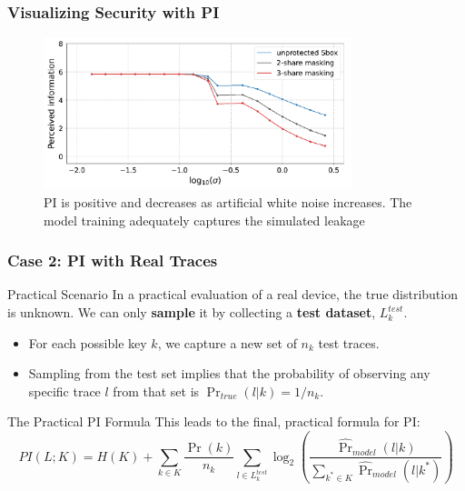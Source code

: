 \begin{frame}
    \frametitle{Visualizing Security with PI}
   \begin{figure}
        \centering
        \includegraphics[width=0.8\textwidth]{metrics/Pictures/PI_masking.png}
        \caption{PI is positive and decreases as artificial white noise increases. The model training adequately captures the simulated leakage}
    \end{figure}
\end{frame}


\begin{frame}
    \frametitle{Case 2: PI with Real Traces}
    
    \begin{block}{Practical Scenario}
        In a practical evaluation of a real device, the true distribution is unknown. We can only \textbf{sample} it by collecting a \textbf{test dataset}, $L_k^{test}$.
        
        \begin{itemize}
            \item For each possible key $k$, we capture a new set of $n_k$ test traces.
            \item Sampling from the test set implies that the probability of observing any specific trace $l$ from that set is $\Pr_{true}(l|k) = 1/n_k$.
        \end{itemize}
    \end{block}
    
    \begin{alertblock}{The Practical PI Formula}
        This leads to the final, practical formula for PI:
        $$ PI(L;K) = H(K) + \sum_{k \in K} \frac{\Pr(k)}{n_k} \sum_{l \in L_k^{test}} \log_2 \left( \frac{\hat{\Pr}_{model}(l|k)}{\sum_{k^* \in K} \hat{\Pr}_{model}(l|k^*)} \right) $$
    \end{alertblock}
\end{frame}

